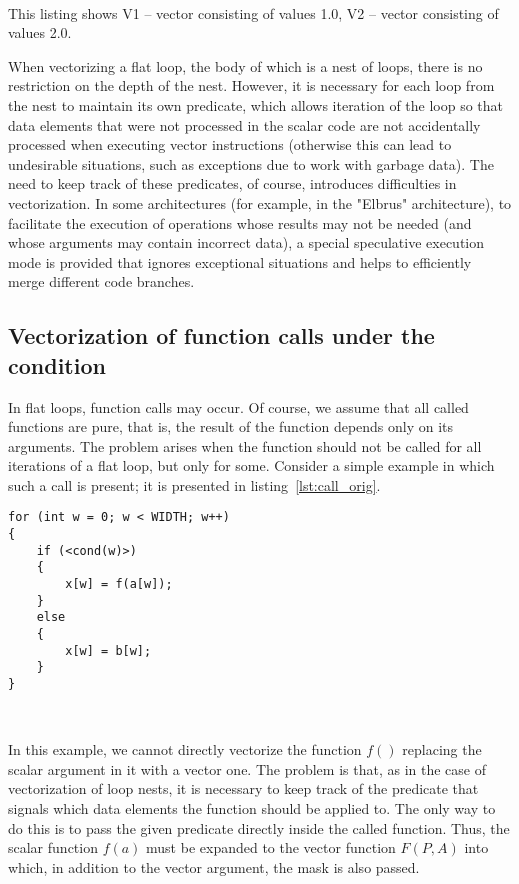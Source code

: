 \documentclass[
11pt,%
tightenlines,%
twoside,%
onecolumn,%
nofloats,%
nobibnotes,%
nofootinbib,%
superscriptaddress,%
noshowpacs,%
centertags]%
{revtex4}
\begin{document}
\

This listing shows V1 -- vector consisting of values 1.0, V2 -- vector consisting of values 2.0.

When vectorizing a flat loop, the body of which is a nest of loops, there is no restriction on the depth of the nest.
However, it is necessary for each loop from the nest to maintain its own predicate, which allows iteration of the loop so that data elements that were not processed in the scalar code are not accidentally processed when executing vector instructions (otherwise this can lead to undesirable situations, such as exceptions due to work with garbage data).
The need to keep track of these predicates, of course, introduces difficulties in vectorization.
In some architectures (for example, in the "Elbrus" architecture), to facilitate the execution of operations whose results may not be needed (and whose arguments may contain incorrect data), a special speculative execution mode is provided that ignores exceptional situations and helps to efficiently merge different code branches.

\subsection{Vectorization of function calls under the condition}

In flat loops, function calls may occur.
Of course, we assume that all called functions are pure, that is, the result of the function depends only on its arguments.
The problem arises when the function should not be called for all iterations of a flat loop, but only for some.
Consider a simple example in which such a call is present; it is presented in listing~\ref{lst:call_orig}.

\begin{lstlisting}[caption={Example of a flat loop with a function call under the condition},label={lst:call_orig}]
for (int w = 0; w < WIDTH; w++)
{
    if (<cond(w)>)
    {
        x[w] = f(a[w]);
    }
    else
    {
        x[w] = b[w];
    }
}
\end{lstlisting}

\

In this example, we cannot directly vectorize the function $f()$ replacing the scalar argument in it with a vector one.
The problem is that, as in the case of vectorization of loop nests, it is necessary to keep track of the predicate that signals which data elements the function should be applied to.
The only way to do this is to pass the given predicate directly inside the called function.
Thus, the scalar function $f(a)$ must be expanded to the vector function $F(P, A)$ into which, in addition to the vector argument, the mask is also passed.
\end{document}

